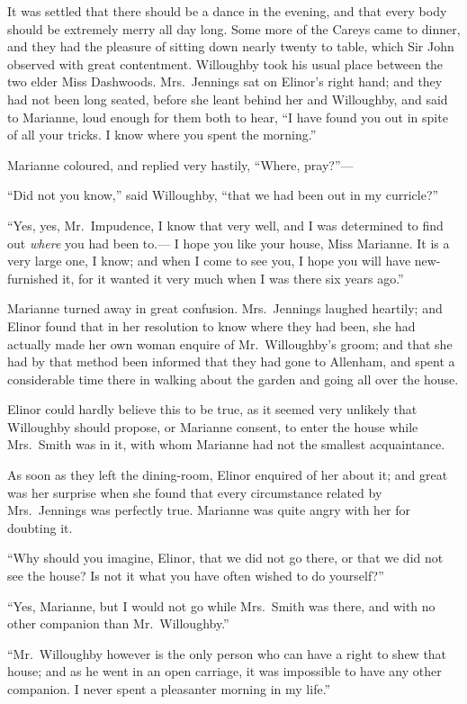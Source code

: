 It was settled that there should be a dance in the evening,
and that every body should be extremely merry all day long.
Some more of the Careys came to dinner, and they had the
pleasure of sitting down nearly twenty to table, which Sir
John observed with great contentment.  Willoughby took
his usual place between the two elder Miss Dashwoods.
Mrs.\ Jennings sat on Elinor's right hand; and they had not
been long seated, before she leant behind her and Willoughby,
and said to Marianne, loud enough for them both to hear,
``I have found you out in spite of all your tricks.
I know where you spent the morning.''

Marianne coloured, and replied very hastily,
``Where, pray?''---%

``Did not you know,'' said Willoughby, ``that we had
been out in my curricle?''

``Yes, yes, Mr.\ Impudence, I know that very well,
and I was determined to find out \emph{where} you had been to.---%
I hope you like your house, Miss Marianne.  It is a very
large one, I know; and when I come to see you, I hope you
will have new-furnished it, for it wanted it very much
when I was there six years ago.''

Marianne turned away in great confusion.
Mrs.\ Jennings laughed heartily; and Elinor found that in her
resolution to know where they had been, she had actually
made her own woman enquire of Mr.\ Willoughby's groom;
and that she had by that method been informed that they
had gone to Allenham, and spent a considerable time there
in walking about the garden and going all over the house.

Elinor could hardly believe this to be true,
as it seemed very unlikely that Willoughby should propose,
or Marianne consent, to enter the house while Mrs.\ Smith was
in it, with whom Marianne had not the smallest acquaintance.

As soon as they left the dining-room, Elinor enquired
of her about it; and great was her surprise when she
found that every circumstance related by Mrs.\ Jennings
was perfectly true.  Marianne was quite angry with her
for doubting it.

``Why should you imagine, Elinor, that we did not
go there, or that we did not see the house?  Is not it
what you have often wished to do yourself?''

``Yes, Marianne, but I would not go while Mrs.\ Smith
was there, and with no other companion than Mr.\ Willoughby.''

``Mr.\ Willoughby however is the only person who can
have a right to shew that house; and as he went in an open
carriage, it was impossible to have any other companion.
I never spent a pleasanter morning in my life.''

